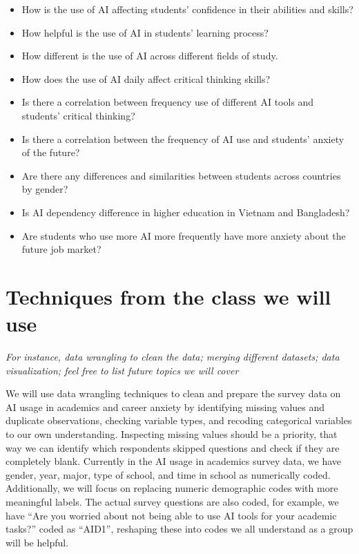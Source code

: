 \documentclass[a4 paper, 12pt]{elsarticle}
\begin{document}
\begin{itemize}
    \item How is the use of AI affecting students' confidence in their abilities and skills? 
    \item How helpful is the use of AI in students' learning process?
    \item How different is the use of AI across different fields of study.
    \item How does the use of AI daily affect critical thinking skills? 
    \item Is there a correlation between frequency use of different AI tools and students’ critical thinking?
    \item Is there a correlation between the frequency of AI use and students’ anxiety of the future? 
    \item Are there any differences and similarities between students across countries by gender?
    \item Is AI dependency difference in higher education in Vietnam and Bangladesh? 
    \item Are students who use more AI more frequently have more anxiety about the future job market?

\end{itemize}

\section*{Techniques from the class we will use}
\textit{For instance, data wrangling to clean the data; merging different datasets; data visualization; feel free to list future topics we will cover}

\text We will use data wrangling techniques to clean and prepare the survey data on AI usage in academics and career anxiety by identifying missing values and duplicate observations, checking variable types, and recoding categorical variables to our own understanding. Inspecting missing values should be a priority, that way we can identify which respondents skipped questions and check if they are completely blank. Currently in the AI usage in academics survey data, we have gender, year, major, type of school, and time in school as numerically coded. Additionally, we will focus on replacing numeric demographic codes with more meaningful labels. The actual survey questions are also coded, for example, we have “Are you worried about not being able to use AI tools for your academic tasks?” coded as “AID1”, reshaping these into codes we all understand as a group will be helpful.
\end{document}
